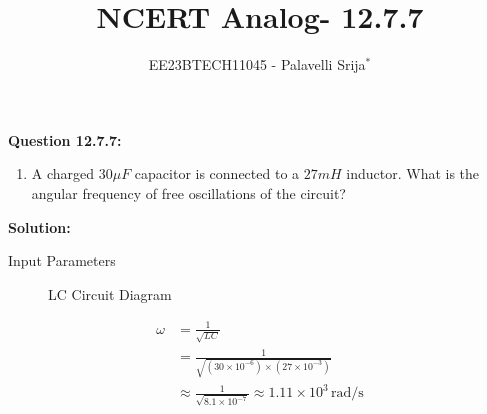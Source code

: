 \documentclass[journal,12pt,onecolumn]{IEEEtran}
\theoremstyle{remark}
\begin{document}

\vspace{3cm}

\title{NCERT Analog- 12.7.7}
\author{EE23BTECH11045 - Palavelli Srija$^{*}$}

\maketitle

\bigskip

\renewcommand{\thefigure}{\theenumi}
\renewcommand{\thetable}{\theenumi}

\vspace{3cm}
\textbf{Question 12.7.7:} 
\begin{enumerate}
\item A charged $30 \mu F$ capacitor is connected to a $27 mH$ inductor. What is the angular frequency of free oscillations of the circuit?
\end{enumerate}

\textbf{Solution: }
\begin{table}[h!]
    \centering
    
    \caption{Input Parameters}
    \label{tab:table_omega}
\end{table}
\begin{figure}[H]
    \centering
    
    \caption{LC Circuit Diagram}
    \label{fig:omega2}
\end{figure}
\begin{align}
\omega &= \frac{1}{\sqrt{LC}} \\
&= \frac{1}{\sqrt{(30 \times 10^{-6}) \times (27 \times 10^{-3})}} \\
&\approx \frac{1}{\sqrt{8.1 \times 10^{-7}}} \approx 1.11 \times 10^{3} \, \text{rad/s}
\end{align}
\end{document}
